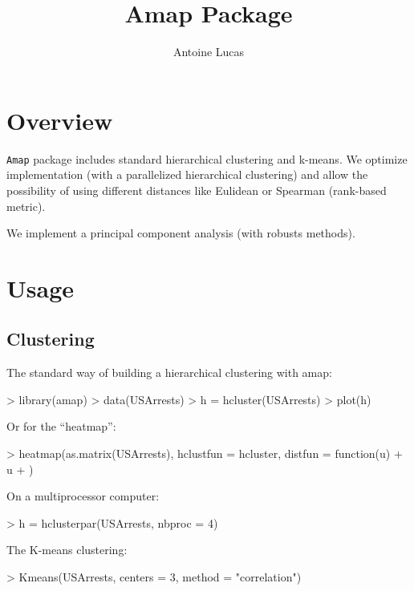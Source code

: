 \documentclass[a4paper]{article}
\title{Amap Package}
\author{Antoine Lucas}
\begin{document}
\maketitle

\tableofcontents

\section{Overview}

{\tt Amap} package includes standard hierarchical  
clustering and k-means. We optimize implementation 
(with a parallelized hierarchical clustering) and
allow the possibility of using different distances like
Eulidean or Spearman (rank-based metric).

We implement a principal component analysis (with robusts methods).

\section{Usage}

\subsection{Clustering}

The standard way of building  a hierarchical clustering with amap:
\begin{Schunk}
\begin{Sinput}
> library(amap)
> data(USArrests)
> h = hcluster(USArrests)
> plot(h)
\end{Sinput}
\end{Schunk}
 Or for the ``heatmap'':
\begin{Schunk}
\begin{Sinput}
> heatmap(as.matrix(USArrests), hclustfun = hcluster, distfun = function(u) {
+     u
+ })
\end{Sinput}
\end{Schunk}
On a multiprocessor computer:
\begin{Schunk}
\begin{Sinput}
> h = hclusterpar(USArrests, nbproc = 4)
\end{Sinput}
\end{Schunk}
The K-means clustering:
\begin{Schunk}
\begin{Sinput}
> Kmeans(USArrests, centers = 3, method = "correlation")
\end{Sinput}
\end{Schunk}
\end{document}
